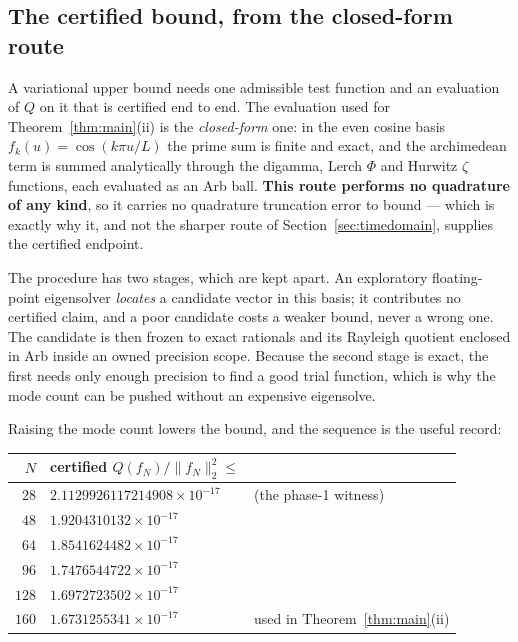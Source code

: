 \documentclass[11pt,a4paper]{article}
\theoremstyle{definition}
\theoremstyle{remark}
\begin{document}
\subsection{The certified bound, from the closed-form route}
\label{sec:upperclosed}

A variational upper bound needs one admissible test function and an evaluation
of $Q$ on it that is certified end to end. The evaluation used for
Theorem~\ref{thm:main}(ii) is the \emph{closed-form} one: in the even cosine
basis $f_k(u) = \cos(k\pi u/L)$ the prime sum is finite and exact, and the
archimedean term is summed analytically through the digamma, Lerch $\Phi$ and
Hurwitz $\zeta$ functions, each evaluated as an Arb ball. \textbf{This route
performs no quadrature of any kind}, so it carries no quadrature truncation
error to bound --- which is exactly why it, and not the sharper route of
Section~\ref{sec:timedomain}, supplies the certified endpoint.

The procedure has two stages, which are kept apart. An exploratory
floating-point eigensolver \emph{locates} a candidate vector in this basis; it
contributes no certified claim, and a poor candidate costs a weaker bound, never
a wrong one. The candidate is then frozen to exact rationals and its Rayleigh
quotient enclosed in Arb inside an owned precision scope. Because the second
stage is exact, the first needs only enough precision to find a good trial
function, which is why the mode count can be pushed without an expensive
eigensolve.

Raising the mode count lowers the bound, and the sequence is the useful record:

\begin{center}
\begin{tabular}{rll}
\toprule
$N$ & certified $Q(f_N)/\|f_N\|_2^2 \le$ & \\
\midrule
$28$  & $2.1129926117214908\times10^{-17}$ & (the phase-1 witness) \\
$48$  & $1.9204310132\times10^{-17}$ & \\
$64$  & $1.8541624482\times10^{-17}$ & \\
$96$  & $1.7476544722\times10^{-17}$ & \\
$128$ & $1.6972723502\times10^{-17}$ & \\
$160$ & $1.6731255341\times10^{-17}$ & used in Theorem~\ref{thm:main}(ii) \\
\bottomrule
\end{tabular}
\end{center}
\end{document}
